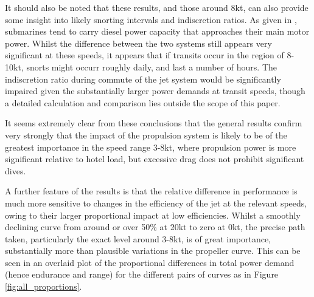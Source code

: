 \documentclass{article}\usepackage[]{graphicx}\usepackage[]{color}
\begin{document}
It should also be noted that these results, and those around 8kt, can also provide some insight into likely snorting intervals and indiscretion ratios.  As given in \cite{patrick2012}, submarines tend to carry diesel power capacity that approaches their main motor power. Whilst the difference between the two systems still appears very significant at these speeds, it appears that if transits occur in the region of 8-10kt, snorts might occurr roughly daily, and last a number of hours.  The indiscretion ratio during commute of the jet system would be significantly impaired given the substantially larger power demands at transit speeds, though a detailed calculation and comparison lies outside the scope of this paper.

It seems extremely clear from these conclusions that the general results confirm very strongly that the impact of the propulsion system is likely to be of the greatest importance in the speed range 3-8kt, where propulsion power is more significant relative to hotel load, but excessive drag does not prohibit significant dives.

A further feature of the results is that the relative difference in performance is much more sensitive to changes in the efficiency of the jet at the relevant speeds, owing to their larger proportional impact at low efficiencies.  Whilst a smoothly declining curve from around or over 50\% at 20kt to zero at 0kt, the precise path taken, particularly the exact level around 3-8kt, is of great importance, substantially more than plausible variations in the propeller curve.  This can be seen in an overlaid plot of the proportional differences in total power demand (hence endurance and range) for the different pairs of curves as in Figure \ref{fig:all_proportions}.
\end{document}
